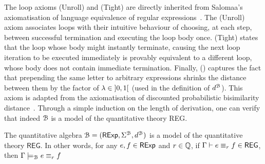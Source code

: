 The loop axioms \textsf{(Unroll)} and \textsf{(Tight)} are directly inherited from Salomaa's axiomatisation of language equivalence of regular expressions~\cite{Salomaa:1966:Two}. The \textsf{(Unroll)} axiom associates loops with their intuitive behaviour of choosing, at each step, between successful termination and executing the loop body once. \textsf{(Tight)} states that the loop whose body might instantly terminate, causing the next loop iteration to be executed immediately is provably equivalent to a different loop, whose body does not contain immediate termination. 
Finally, \textsf{(\dPref)} captures the fact that prepending the same letter to arbitrary expressions shrinks the distance between them by the factor of $\lambda \in \interval[open]{0}{1}$ (used in the definition of $d^{\mathcal{B}}$). This axiom is adapted from the axiomatisation of discounted probabilistic bisimilarity distance~\cite{Bacci:2018:Bisimilarity}.
Through a simple induction on the length of derivation, one can verify that indeed $\mathcal{B}$ is a model of the quantitative theory \textsf{REG}. 
\begin{theorem}[Soundness]\label{c2:thm:soundness}
    The quantitative algebra $\mathcal{B} = (\mathsf{RExp}, \Sigma^{\mathcal{B}}, d^{\mathcal{B}})$ is a model of the quantitative theory $\mathsf{REG}$. In other words, for any $e, f \in \mathsf{RExp}$ and $r \in \mathbb{Q}$, if $\Gamma \vdash e \equiv_r f \in \mathsf{REG}$, then $\Gamma \models_{\mathcal{B}} e \equiv_r f$
\end{theorem}
